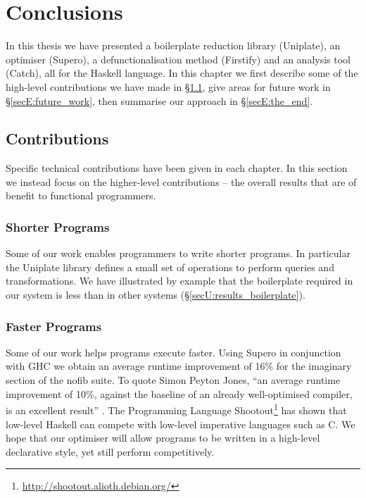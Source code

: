 

\chapter{Conclusions}
\label{chp:conclusions}

In this thesis we have presented a boilerplate reduction library (Uniplate), an optimiser (Supero), a defunctionalisation method (Firstify) and an analysis tool (Catch), all for the Haskell language. In this chapter we first describe some of the high-level contributions we have made in \S\ref{secE:contributions}, give areas for future work in \S\ref{secE:future_work}, then summarise our approach in \S\ref{secE:the_end}.


\section{Contributions}
\label{secE:contributions}

Specific technical contributions have been given in each chapter. In this section we instead focus on the higher-level contributions -- the overall results that are of benefit to functional programmers.

\subsection{Shorter Programs}

Some of our work enables programmers to write shorter programs. In particular the Uniplate library defines a small set of operations to perform queries and transformations. We have illustrated by example that the boilerplate required in our system is less than in other systems (\S\ref{secU:results_boilerplate}).

\subsection{Faster Programs}

Some of our work helps programs execute faster. Using Supero in conjunction with GHC we obtain an average runtime improvement of 16\% for the imaginary section of the nofib suite. To quote Simon Peyton Jones, ``an average runtime improvement of 10\%, against the baseline of an already well-optimised compiler, is an excellent result'' \cite{spj:specconstr}. The Programming Language Shootout\footnote{\url{http://shootout.alioth.debian.org/}} has shown that low-level Haskell can compete with low-level imperative languages such as C. We hope that our optimiser will allow programs to be written in a high-level declarative style, yet still perform competitively.

